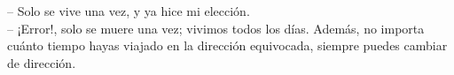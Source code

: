 
\begin{phrase}[3in]
	-- Solo se vive una vez, y ya hice mi elección.\\
	-- ¡Error!, solo se muere una vez; vivimos todos los días. Además, no importa cuánto tiempo hayas viajado en la dirección equivocada, siempre puedes cambiar de dirección.
\end{phrase}